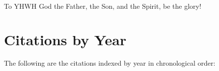     To YHWH God the Father, the Son, and the Spirit, be the glory!






\appendix

\makeatletter
\renewcommand{\thesection}{\@Alph\c@section}
\makeatother

\renewcommand*{\thesection}{\Alph{section}}

\section{Citations by Year}

    The following are the citations indexed by year in chronological order: 


